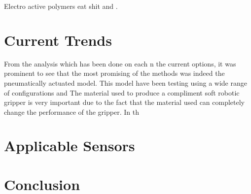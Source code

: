 \documentclass[11pt,twocolumn]{article}
\begin{document}
Electro active polymers eat shit \cite{mutlu2013electroactive} and \cite{pillay2014review}.
\section{Current Trends }
From the analysis which has been done on each n the current options, it was prominent to see that the most promising of the methods was indeed the pneumatically actuated model. This model have been testing using a wide range of configurations and
The material used to produce a compliment soft robotic gripper is very important due to the fact that the material used can completely change the performance of the gripper. In th
\section{Applicable Sensors}
\section{Conclusion}
\pagebreak


\end{document}
